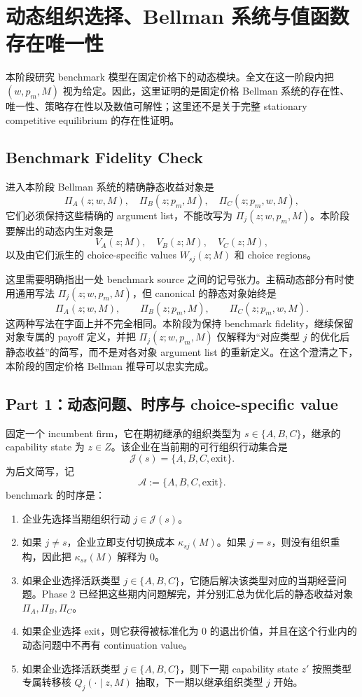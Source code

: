 ﻿\section{动态组织选择、Bellman 系统与值函数存在唯一性}

本阶段研究 benchmark 模型在固定价格下的动态模块。全文在这一阶段内把 $(w,p_m,M)$ 视为给定。因此，这里证明的是固定价格 Bellman 系统的存在性、唯一性、策略存在性以及数值可解性；这里还不是关于完整 stationary competitive equilibrium 的存在性证明。

\subsection{Benchmark Fidelity Check}

进入本阶段 Bellman 系统的精确静态收益对象是
\[
\Pi_A(z;w,M),\quad \Pi_B(z;p_m,M),\quad \Pi_C(z;p_m,w,M),
\]
它们必须保持这些精确的 argument list，不能改写为 $\Pi_j(z;w,p_m,M)$。本阶段要解出的动态内生对象是
\[
V_A(z;M),\quad V_B(z;M),\quad V_C(z;M),
\]
以及由它们派生的 choice-specific values $W_{sj}(z;M)$ 和 choice regions。

这里需要明确指出一处 benchmark source 之间的记号张力。主稿动态部分有时使用通用写法 $\Pi_j(z;w,p_m,M)$，但 canonical 的静态对象始终是
\[
\Pi_A(z;w,M),\qquad \Pi_B(z;p_m,M),\qquad \Pi_C(z;p_m,w,M).
\]
这两种写法在字面上并不完全相同。本阶段为保持 benchmark fidelity，继续保留对象专属的 payoff 定义，并把 $\Pi_j(z;w,p_m,M)$ 仅解释为“对应类型 $j$ 的优化后静态收益”的简写，而不是对各对象 argument list 的重新定义。在这个澄清之下，本阶段的固定价格 Bellman 推导可以忠实完成。

\subsection{Part 1：动态问题、时序与 choice-specific value}

固定一个 incumbent firm，它在期初继承的组织类型为 $s\in\{A,B,C\}$，继承的 capability state 为 $z\in Z$。该企业在当前期的可行组织行动集合是
\[
\mathcal J(s)=\{A,B,C,\mathrm{exit}\}.
\]
为后文简写，记
\[
\mathcal A:=\{A,B,C,\mathrm{exit}\}.
\]
benchmark 的时序是：
\begin{enumerate}
    \item 企业先选择当期组织行动 $j\in\mathcal J(s)$。
    \item 如果 $j\neq s$，企业立即支付切换成本 $\kappa_{sj}(M)$。如果 $j=s$，则没有组织重构，因此把 $\kappa_{ss}(M)$ 解释为 $0$。
    \item 如果企业选择活跃类型 $j\in\{A,B,C\}$，它随后解决该类型对应的当期经营问题。Phase 2 已经把这些期内问题解完，并分别汇总为优化后的静态收益对象 $\Pi_A,\Pi_B,\Pi_C$。
    \item 如果企业选择 exit，则它获得被标准化为 $0$ 的退出价值，并且在这个行业内的动态问题中不再有 continuation value。
    \item 如果企业选择活跃类型 $j\in\{A,B,C\}$，则下一期 capability state $z'$ 按照类型专属转移核 $Q_j(\cdot\mid z,M)$ 抽取，下一期以继承组织类型 $j$ 开始。
\end{enumerate}

